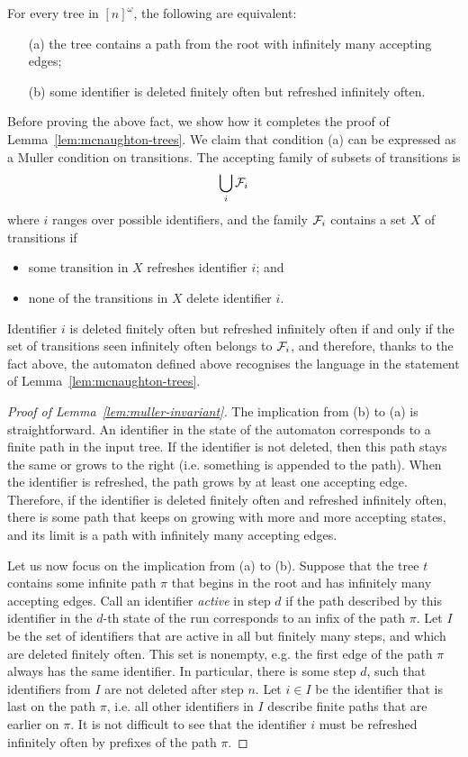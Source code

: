 \begin{lemma}\label{lem:muller-invariant}
For every tree in $[n]^\omega$, the following are equivalent:
\begin{enumerate}
	\item[(a)] the tree contains a path from the root with infinitely many accepting edges;
\item[(b)] some identifier is deleted finitely often but refreshed infinitely often.
\end{enumerate}
\end{lemma}
Before proving the above fact, we show how it completes the proof of Lemma~\ref{lem:mcnaughton-trees}. We claim that condition (a) can be expressed as a Muller condition on transitions. The accepting family of subsets of transitions is $$\bigcup_i \mathcal{F}_i$$ where $i$ ranges over possible identifiers, and the family $\mathcal{F}_i$ contains a set $X$ of transitions if
\begin{itemize}
	\item some transition in $X$ refreshes identifier $i$; and
	\item  none of the transitions in $X$ delete identifier $i$.
\end{itemize}


Identifier $i$ is deleted finitely often but refreshed infinitely often if and only if the set of transitions seen infinitely often belongs to $\mathcal{F}_i$, and therefore, thanks to the fact above, the automaton defined above recognises the language in the statement of Lemma~\ref{lem:mcnaughton-trees}. 

\begin{proof}[Proof of Lemma~\ref{lem:muller-invariant}]
The implication from (b) to (a) is straightforward. An identifier in the state of the automaton corresponds to a finite path in the input tree. If the identifier is not deleted, then this path stays the same or grows to the right (i.e. something is appended to the path). When the identifier is refreshed, the path grows by at least one accepting edge. Therefore, if the identifier is deleted finitely often and refreshed infinitely often, there is some path that keeps on growing with more and more accepting states, and its limit is a path with infinitely many accepting edges.

Let us now focus on the implication from (a) to (b). Suppose that the tree $t$ contains some infinite path $\pi$ that begins in the root and has infinitely many accepting edges. Call an identifier \emph{active} in step $d$ if the path described by this identifier in the $d$-th state of the run corresponds to an infix of the path $\pi$. Let $I$ be the set of identifiers that are active in all but finitely many steps, and which are deleted finitely often. This set is nonempty, e.g. the first edge of the path $\pi$  always has the same identifier. In particular, there is some step $d$, such that identifiers from $I$ are not deleted after step $n$. Let $i \in I$ be the identifier that is last on the path $\pi$, i.e. all other identifiers in $I$ describe finite paths that are earlier on $\pi$. It is not difficult to see that the identifier $i$ must be refreshed infinitely often by prefixes of the path $\pi$.
\end{proof}



